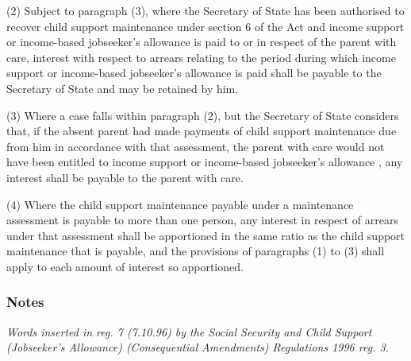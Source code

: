 \documentclass[a4paper]{article}
\newcommand\amendment[1]{\subsubsection*{Notes}{\itshape\frenchspacing\footnotesize #1 \par}}
\begin{document}
(2) Subject to paragraph (3), where the Secretary of State has been authorised to recover child support maintenance under section 6 of the Act and income support
or income-based jobseeker’s allowance  %
is paid to or in respect of the parent with care, interest with respect to arrears relating to the period during which income support 
or income-based jobseeker’s allowance  %
is paid shall be payable to the Secretary of State and may be retained by him.

(3) Where a case falls within paragraph (2), but the Secretary of State considers that, if the absent parent had made payments of child support maintenance due from him in accordance with that assessment, the parent with care would not have been entitled to income support
or income-based jobseeker’s allowance%
, any interest shall be payable to the parent with care.

(4) Where the child support maintenance payable under a maintenance assessment is payable to more than one person, any interest in respect of arrears under that assessment shall be apportioned in the same ratio as the child support maintenance that is payable, and the provisions of paragraphs (1) to (3) shall apply to each amount of interest so apportioned.

\amendment{
Words inserted in reg. 7 (7.10.96) by the Social Security and Child Support (Jobseeker's Allowance) (Consequential Amendments) Regulations 1996 reg. 3.
}

%

\end{document}
